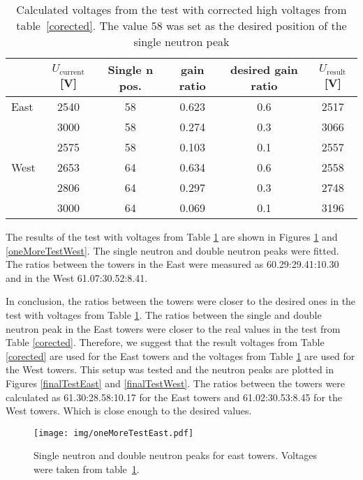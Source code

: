 \begin{table}[htb] 
\caption{Calculated voltages from the test with corrected high voltages from table~\ref{corected}.
The value 58 was set as the desired position of the single neutron peak}
\label{thirdCalib}
\begin{center}
\begin{tabular}{lccccc}
 \toprule
 &$U_\text{current}$[V]&Single n pos.&gain ratio&desired gain ratio&$U_\text{result}$[V]\\
\midrule
East  &2540  &58 &0.623  &0.6 &2517 \\
      &3000  &58 &0.274  &0.3 &3066 \\
      &2575  &58 &0.103	&0.1 &2557 \\
\midrule
West  &2653  &64 &0.634 &0.6 &2558 \\
      &2806  &64 &0.297 &0.3 &2748 \\
      &3000  &64 &0.069 &0.1 &3196 \\
\bottomrule
\end{tabular}
\end{center}
\end{table}

The results of the test with voltages from Table \ref{thirdCalib} are shown in
Figures \ref{oneMoreTestEast} and \ref{oneMoreTestWest}\@. The single neutron and double
neutron peaks were fitted. The ratios between the towers in the East were measured as
60.29:29.41:10.30 and in the West 61.07:30.52:8.41. 

In conclusion, the ratios between the towers were closer to the desired ones in the
test with voltages from Table \ref{thirdCalib}. The ratios between the single and double
neutron peak in the East towers were closer to the real values in the test from
Table \ref{corected}. Therefore, we suggest that the result voltages from Table \ref{corected}
are used for the East towers and the voltages from Table \ref{thirdCalib} are used for the
West towers. This setup was tested and the neutron peaks are plotted in Figures \ref{finalTestEast}
and \ref{finalTestWest}. The ratios between the towers were calculated as
61.30:28.58:10.17 for the East towers and 61.02:30.53:8.45 for the West towers.
Which is close enough to the desired values.

\begin{figure}[!htb]
\begin{center}
\texttt{[image: img/oneMoreTestEast.pdf]}
\end{center}
\caption{Single neutron and double neutron peaks for east towers.
Voltages were taken from table~\ref{thirdCalib}.}
\label{oneMoreTestEast}
\end{figure}

